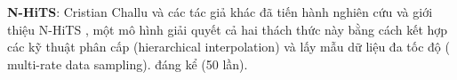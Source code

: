 \par
\textbf{N-HiTS}: Cristian Challu và các tác giả khác đã tiến hành nghiên cứu và giới thiệu N-HiTS \cite{b8}, một mô hình giải quyết cả hai thách thức này bằng cách kết hợp các kỹ thuật phân cấp (hierarchical interpolation) và lấy mẫu dữ liệu đa tốc độ ( multi-rate data sampling). %
đáng kể (50 lần).